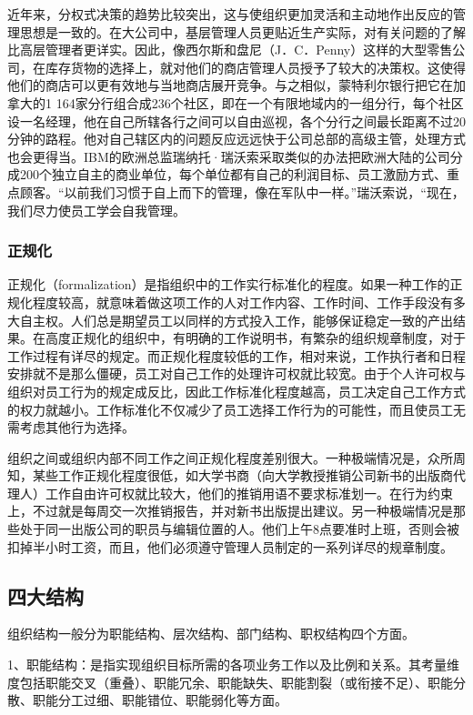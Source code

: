     近年来，分权式决策的趋势比较突出，这与使组织更加灵活和主动地作出反应的管理思想是一致的。在大公司中，基层管理人员更贴近生产实际，对有关问题的了解比高层管理者更详实。因此，像西尔斯和盘尼（J．C．Penny）这样的大型零售公司，在库存货物的选择上，就对他们的商店管理人员授予了较大的决策权。这使得他们的商店可以更有效地与当地商店展开竞争。与之相似，蒙特利尔银行把它在加拿大的1 164家分行组合成236个社区，即在一个有限地域内的一组分行，每个社区设一名经理，他在自己所辖各行之间可以自由巡视，各个分行之间最长距离不过20分钟的路程。他对自己辖区内的问题反应远远快于公司总部的高级主管，处理方式也会更得当。IBM的欧洲总监瑞纳托·瑞沃索采取类似的办法把欧洲大陆的公司分成200个独立自主的商业单位，每个单位都有自己的利润目标、员工激励方式、重点顾客。“以前我们习惯于自上而下的管理，像在军队中一样。”瑞沃索说，“现在，我们尽力使员工学会自我管理。

    \subsubsection {正规化}

    正规化（formalization）是指组织中的工作实行标准化的程度。如果一种工作的正规化程度较高，就意味着做这项工作的人对工作内容、工作时间、工作手段没有多大自主权。人们总是期望员工以同样的方式投入工作，能够保证稳定一致的产出结果。在高度正规化的组织中，有明确的工作说明书，有繁杂的组织规章制度，对于工作过程有详尽的规定。而正规化程度较低的工作，相对来说，工作执行者和日程安排就不是那么僵硬，员工对自己工作的处理许可权就比较宽。由于个人许可权与组织对员工行为的规定成反比，因此工作标准化程度越高，员工决定自己工作方式的权力就越小。工作标准化不仅减少了员工选择工作行为的可能性，而且使员工无需考虑其他行为选择。

    组织之间或组织内部不同工作之间正规化程度差别很大。一种极端情况是，众所周知，某些工作正规化程度很低，如大学书商（向大学教授推销公司新书的出版商代理人）工作自由许可权就比较大，他们的推销用语不要求标准划一。在行为约束上，不过就是每周交一次推销报告，并对新书出版提出建议。另一种极端情况是那些处于同一出版公司的职员与编辑位置的人。他们上午8点要准时上班，否则会被扣掉半小时工资，而且，他们必须遵守管理人员制定的一系列详尽的规章制度。

\subsection {四大结构}

    组织结构一般分为职能结构、层次结构、部门结构、职权结构四个方面。

    1、职能结构：是指实现组织目标所需的各项业务工作以及比例和关系。其考量维度包括职能交叉（重叠）、职能冗余、职能缺失、职能割裂（或衔接不足）、职能分散、职能分工过细、职能错位、职能弱化等方面。


